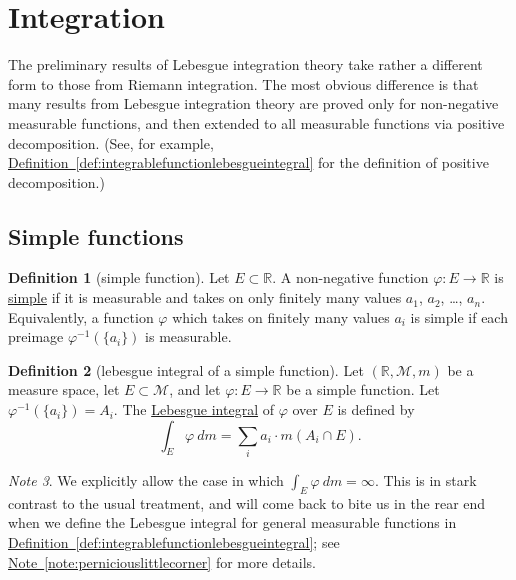 \documentclass[a4paper,12pt]{scrreprt}
\newcommand{\R}{\mathbb{R}}
\newcommand{\defn}[1]{\ul{#1}}
\theoremstyle{definition}
\newtheorem{definition}{Definition}
\theoremstyle{plain}
\theoremstyle{remark}
\newtheorem{note}[definition]{Note}
\begin{document}
\section{Integration}
The preliminary results of Lebesgue integration theory take rather a different form to those from Riemann integration. The most obvious difference is that many results from Lebesgue integration theory are proved only for non-negative measurable functions, and then extended to all measurable functions via positive decomposition. (See, for example, \hyperref[def:integrablefunctionlebesgueintegral]{Definition~\ref*{def:integrablefunctionlebesgueintegral}} for the definition of positive decomposition.)

\subsection{Simple functions}

\begin{definition}[simple function]
  \label{def:simplefunction}
  Let $E \subset \R$. A non-negative function $\varphi\colon E \to \R$ is \defn{simple} if it is measurable and takes on only finitely many values $a_{1}$, $a_{2}$, \ldots, $a_{n}$. Equivalently, a function $\varphi$ which takes on finitely many values $a_{i}$ is simple if each preimage $\varphi^{-1}(\{a_{i}\})$ is measurable.
\end{definition}

\begin{definition}[lebesgue integral of a simple function]
  \label{def:lebesgueintegralofsimplefunction}
  Let $(\R, \mathcal{M}, m)$ be a measure space, let $E \subset \mathcal{M}$, and let $\varphi\colon E \to \R$ be a simple function. Let $ \varphi^{-1}\left( \{ a_{i} \} \right) = A_{i}$. The \defn{Lebesgue integral} of $\varphi$ over $E$ is defined by
  \begin{equation*}
    \int_{E} \varphi\ dm = \sum_{i} a_{i}\cdot m(A_{i} \cap E).
  \end{equation*}
\end{definition}

\begin{note}
  We explicitly allow the case in which $\int_{E} \varphi\ dm = \infty$. This is in stark contrast to the usual treatment, and will come back to bite us in the rear end when we define the Lebesgue integral for general measurable functions in \hyperref[def:integrablefunctionlebesgueintegral]{Definition~\ref*{def:integrablefunctionlebesgueintegral}}; see \hyperref[note:perniciouslittlecorner]{Note~\ref*{note:perniciouslittlecorner}} for more details.
\end{note}
\end{document}
